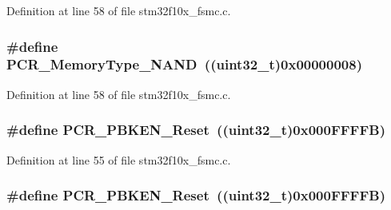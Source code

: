 Definition at line 58 of file stm32f10x\+\_\+fsmc.\+c.

\subsubsection[{\texorpdfstring{P\+C\+R\+\_\+\+Memory\+Type\+\_\+\+N\+A\+ND}{PCR_MemoryType_NAND}}]{\setlength{\rightskip}{0pt plus 5cm}\#define P\+C\+R\+\_\+\+Memory\+Type\+\_\+\+N\+A\+ND~(({\bf uint32\+\_\+t})0x00000008)}\hypertarget{group___f_s_m_c___private___defines_gaf3992efb285ab994c41463af5107c501}{}\label{group___f_s_m_c___private___defines_gaf3992efb285ab994c41463af5107c501}


Definition at line 58 of file stm32f10x\+\_\+fsmc.\+c.

\subsubsection[{\texorpdfstring{P\+C\+R\+\_\+\+P\+B\+K\+E\+N\+\_\+\+Reset}{PCR_PBKEN_Reset}}]{\setlength{\rightskip}{0pt plus 5cm}\#define P\+C\+R\+\_\+\+P\+B\+K\+E\+N\+\_\+\+Reset~(({\bf uint32\+\_\+t})0x000\+F\+F\+F\+F\+B)}\hypertarget{group___f_s_m_c___private___defines_gac6d0ddc3888a0554b032f0f484cfe332}{}\label{group___f_s_m_c___private___defines_gac6d0ddc3888a0554b032f0f484cfe332}


Definition at line 55 of file stm32f10x\+\_\+fsmc.\+c.

\subsubsection[{\texorpdfstring{P\+C\+R\+\_\+\+P\+B\+K\+E\+N\+\_\+\+Reset}{PCR_PBKEN_Reset}}]{\setlength{\rightskip}{0pt plus 5cm}\#define P\+C\+R\+\_\+\+P\+B\+K\+E\+N\+\_\+\+Reset~(({\bf uint32\+\_\+t})0x000\+F\+F\+F\+F\+B)}\hypertarget{group___f_s_m_c___private___defines_gac6d0ddc3888a0554b032f0f484cfe332}{}\label{group___f_s_m_c___private___defines_gac6d0ddc3888a0554b032f0f484cfe332}


